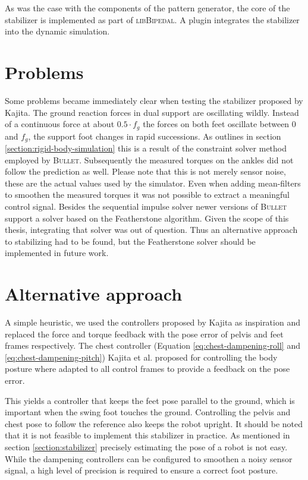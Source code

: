 \documentclass[english,ngerman]{KITreprt}
\newcommand{\name}[1]{\textsc{#1}}
\begin{document}
As was the case with the components of the pattern generator, the core
of the stabilizer is implemented as part of \name{libBipedal}. A plugin
integrates the stabilizer into the dynamic simulation.

\section{Problems}\label{problems}

Some problems became immediately clear when testing the stabilizer
proposed by Kajita. The ground reaction forces in dual support are
oscillating wildly. Instead of a continuous force at about
$0.5 \cdot f_g$ the forces on both feet oscillate between $0$ and $f_g$,
the support foot changes in rapid successions. As outlines in section
\ref{section:rigid-body-simulation} this is a result of the constraint
solver method employed by \name{Bullet}. Subsequently the measured
torques on the ankles did not follow the prediction as well. Please note
that this is not merely sensor noise, these are the actual values used
by the simulator. Even when adding mean-filters to smoothen the measured
torques it was not possible to extract a meaningful control signal.
Besides the sequential impulse solver newer versions of \name{Bullet}
support a solver based on the Featherstone algorithm. Given the scope of
this thesis, integrating that solver was out of question. Thus an
alternative approach to stabilizing had to be found, but the
Featherstone solver should be implemented in future work.

\section{Alternative approach}\label{section:alternative-approach}

A simple heuristic, we used the controllers proposed by Kajita as
inspiration and replaced the force and torque feedback with the pose
error of pelvis and feet frames respectively. The chest controller
(Equation \ref{eq:chest-dampening-roll} and
\ref{eq:chest-dampening-pitch}) Kajita et al. proposed for controlling
the body posture where adapted to all control frames to provide a
feedback on the pose error.

This yields a controller that keeps the feet pose parallel to the
ground, which is important when the swing foot touches the ground.
Controlling the pelvis and chest pose to follow the reference also keeps
the robot upright. It should be noted that it is not feasible to
implement this stabilizer in practice. As mentioned in section
\ref{section:stabilizer} precisely estimating the pose of a robot is not
easy. While the dampening controllers can be configured to smoothen a
noisy sensor signal, a high level of precision is required to ensure a
correct foot posture.
\end{document}
